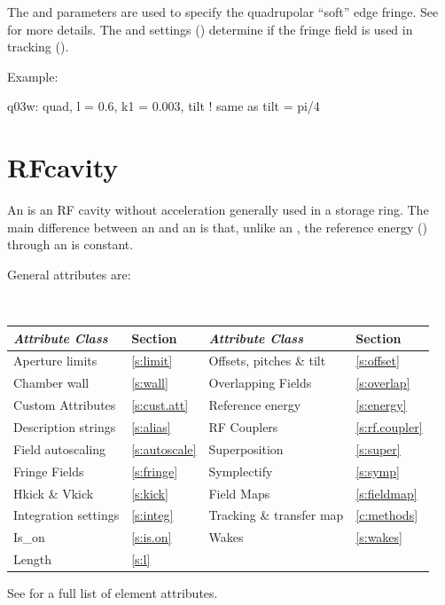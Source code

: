 {The  and  parameters are used to specify the
quadrupolar ``soft'' edge fringe. See  for more details.
The  and  settings ()
determine if the fringe field is used in tracking ().

Example:
\begin{example}
  q03w: quad, l = 0.6, k1 = 0.003, tilt  ! same as tilt = pi/4
\end{example}

\section{RFcavity}
\label{s:rfcav}

An  is an RF cavity without acceleration generally used
in a storage ring. The main difference between an  and an
 is that, unlike an , the reference energy
() through an  is constant.

General  attributes are:
\begin{center}
\tt
\begin{tabular}{llll} \toprule
  {\sl Attribute Class}      & Section            & {\sl Attribute Class}      & Section            \\ \midrule
  Aperture limits            & \ref{s:limit}      & Offsets, pitches \& tilt   & \ref{s:offset}     \\
  Chamber wall               & \ref{s:wall}       & Overlapping Fields         & \ref{s:overlap}    \\
  Custom Attributes          & \ref{s:cust.att}   & Reference energy           & \ref{s:energy}     \\ 
  Description strings        & \ref{s:alias}      & RF Couplers                & \ref{s:rf.coupler} \\
  Field autoscaling          & \ref{s:autoscale}  & Superposition              & \ref{s:super}      \\
  Fringe Fields              & \ref{s:fringe}     & Symplectify                & \ref{s:symp}       \\
  Hkick \& Vkick             & \ref{s:kick}       & Field Maps                 & \ref{s:fieldmap}   \\
  Integration settings       & \ref{s:integ}      & Tracking \& transfer map   & \ref{c:methods}    \\
  Is_on                      & \ref{s:is.on}      & Wakes                      & \ref{s:wakes}      \\
  Length                     & \ref{s:l}          &                            &                    \\
  \bottomrule
\end{tabular}
\end{center}
\toffset
See  for a full list of element attributes.

}
